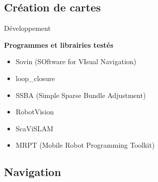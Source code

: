 \documentclass{beamer}
\begin{document}
\subsection*{Création de cartes}
\begin{frame}{Développement}
  \begin{center}
    \begin{Large}
      \textbf{Programmes et librairies testés}
    \end{Large}
  \end{center}
  \begin{itemize}
  \item Sovin (SOftware for VIsual Navigation)
  \item loop\_closure
  \item SSBA (Simple Sparse Bundle Adjustment)
  \item RobotVision
  \item ScaViSLAM
  \item MRPT (Mobile Robot Programming Toolkit)

  \end{itemize}
\end{frame}

\subsection*{Navigation}
\begin{frame}

\end{frame}
\end{document}
